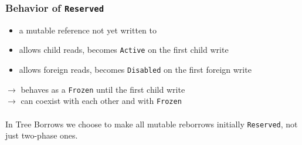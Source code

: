 \begin{frame}
    \frametitle{Behavior of \texttt{Reserved}}
    \begin{itemize}
        \item a mutable reference not yet written to
        \item allows child reads, becomes \texttt{Active} on the first child write
        \item allows foreign reads, becomes \texttt{Disabled} on the first foreign write
    \end{itemize}
    \(\to\) behaves as a \texttt{Frozen} until the first child write\\
    \(\to\) can coexist with each other and with \texttt{Frozen}\\

    ~\\
    In Tree Borrows we choose to make all mutable reborrows initially \texttt{Reserved},
    not just two-phase ones.
\end{frame}

